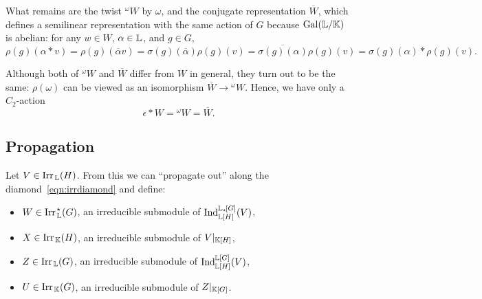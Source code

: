     What remains are the twist ${}^{\omega} W$ by $\omega$, and the conjugate representation $\overline{W}$, which defines a semilinear representation with the same action of $G$ because $\operatorname{Gal}({\mathbb L} / {\mathbb K})$ is abelian: for any $w \in W$, $\alpha \in {\mathbb L}$, and $g \in G$,
    \[
    \rho(g)(\alpha * v) = \rho(g)(\overline{\alpha}v) = \sigma(g)(\overline{\alpha}) \rho(g)(v) = \overline{\sigma(g)(\alpha)} \rho(g)(v) = \sigma(g)(\alpha) * \rho(g)(v).
    \]
    
    Although both of ${}^{\omega} W$ and $\overline{W}$ differ from $W$ in general, they turn out to be the same: $\rho (\omega)$ can be viewed as an isomorphism $\overline{W} \to {}^{\omega}W$. Hence, we have only a $C_2$-action
\[
    \epsilon  * W =  {}^{\omega}W = \overline{W}.
    \]

\subsection{Propagation}\label{sect:propagation}

Let $V \in \operatorname{Irr}_{\, {\mathbb L}}(H)$. From this we can ``propagate out'' along the diamond~\eqref{eqn:irrdiamond} and define: \vspace{0.5em}
\begin{itemize}
    \item $W \in \operatorname{Irr}_{\, {\mathbb L}}^{\hspace{0.1em} \star}(G)$, an irreducible submodule of $\operatorname{Ind}_{{\mathbb L}[H]}^{{\mathbb L}_{\star \hspace{-0.1em}}[G]}(V)$, \vspace{0.5em}
    \item $X \in \operatorname{Irr}_{\, {\mathbb K}}(H)$, an irreducible submodule of $V|_{{\mathbb K}[H]}$, \vspace{0.5em}
    \item $Z \in \operatorname{Irr}_{\, {\mathbb L}}(G)$, an irreducible submodule of $\operatorname{Ind}_{{\mathbb L}[H]}^{{\mathbb L}[G]}(V)$, \vspace{0.5em}
    \item $U \in \operatorname{Irr}_{\, {\mathbb K}}(G)$, an irreducible submodule of $Z|_{{\mathbb K}[G]}$.
\end{itemize}


